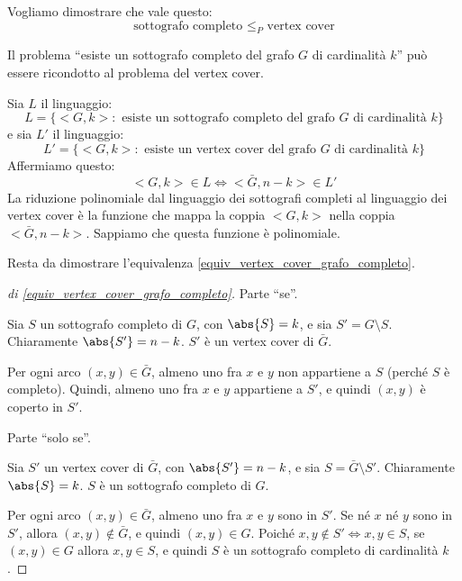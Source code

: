 Vogliamo dimostrare che vale questo:
\[
\text{sottografo completo } \le_P \text{ vertex cover}
\]

Il problema ``esiste un sottografo completo del grafo $G$ di cardinalit\`a $k$'' pu\`o essere ricondotto al problema del vertex cover.

Sia $L$ il linguaggio:
\[
L = \{ <G,k> : \text{ esiste un sottografo completo del grafo $G$ di cardinalit\`a $k$}\}
\]
e sia $L'$ il linguaggio:
\[
L' = \{ <G,k> : \text{ esiste un vertex cover del grafo $G$ di cardinalit\`a $k$}\}
\]
Affermiamo questo:
\begin{equation}
\label{equiv_vertex_cover_grafo_completo}
<G,k> \in L \iff <\bar{G}, n - k> \in L'
\end{equation}
La riduzione polinomiale dal linguaggio dei sottografi completi al linguaggio dei vertex cover \`e la funzione che mappa la coppia $<G,k>$ nella coppia $<\bar{G}, n - k>$. Sappiamo che questa funzione \`e polinomiale.

Resta da dimostrare l'equivalenza \ref{equiv_vertex_cover_grafo_completo}.

\begin{proof}[di \ref{equiv_vertex_cover_grafo_completo}]
Parte ``se''.

Sia $S$ un sottografo completo di $G$, con $\abs{S} = k$, e sia $S' = G \setminus S$. Chiaramente $\abs{S'} = n - k$. $S'$ \`e un vertex cover di $\bar{G}$.

Per ogni arco $(x,y) \in \bar{G}$, almeno uno fra $x$ e $y$ non appartiene a $S$ (perch\'e $S$ \`e completo). Quindi, almeno uno fra $x$ e $y$ appartiene a $S'$, e quindi $(x,y)$ \`e coperto in $S'$.

Parte ``solo se''.
 
Sia $S'$ un vertex cover di $\bar{G}$, con $\abs{S'} = n - k$, e sia $S = \bar{G} \setminus S'$. Chiaramente $\abs{S} = k$. $S$ \`e un sottografo completo di $G$.

Per ogni arco $(x,y) \in \bar{G}$, almeno uno fra $x$ e $y$ sono in $S'$. Se n\'e $x$ n\'e $y$ sono in $S'$, allora $(x,y) \notin \bar{G}$, e quindi $(x,y) \in G$. Poich\'e $x,y \notin S' \iff x,y \in S$, se $(x,y) \in G$ allora $x,y \in S$, e quindi $S$ \`e un sottografo completo di cardinalit\`a $k$.
\end{proof}


